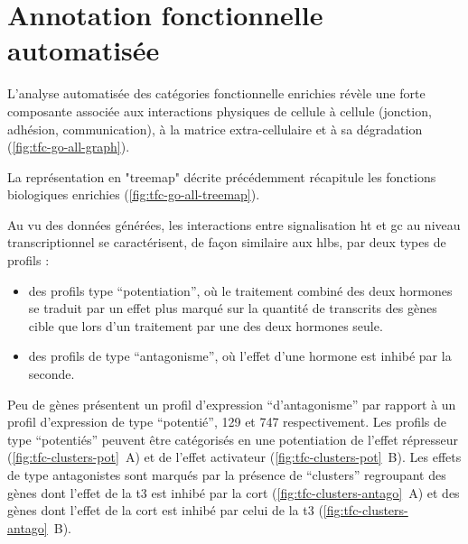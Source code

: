 \documentclass[../main.tex]{subfiles}
\begin{document}


\section{Annotation fonctionnelle automatisée}

L'analyse automatisée des catégories fonctionnelle enrichies révèle une forte composante associée aux interactions physiques de cellule à cellule (jonction, adhésion, communication), à la matrice extra-cellulaire et à sa dégradation (\autoref{fig:tfc-go-all-graph}).



La représentation en "treemap" décrite précédemment récapitule les fonctions biologiques enrichies (\autoref{fig:tfc-go-all-treemap}).



Au vu des données générées, les interactions entre signalisation \gls{ht} et \gls{gc} au niveau transcriptionnel se caractérisent, de façon similaire aux \glspl{hlb}, par deux types de profils :
\begin{itemize}
\item des profils type ``potentiation'', où le traitement combiné des deux hormones se traduit par un effet plus marqué sur la quantité de transcrits des gènes cible que lors d'un traitement par une des deux hormones seule.
\item des profils de type ``antagonisme'', où l'effet d'une hormone est inhibé par la seconde.
\end{itemize}
\par
Peu de gènes présentent un profil d'expression ``d'antagonisme'' par rapport à un profil d'expression de type ``potentié'', 129 et 747 respectivement.
Les profils de type ``potentiés'' peuvent être catégorisés en une potentiation de l'effet répresseur (\autoref{fig:tfc-clusters-pot}~A) et de l'effet activateur (\autoref{fig:tfc-clusters-pot}~B).
Les effets de type antagonistes sont marqués par la présence de ``clusters'' regroupant des gènes dont l'effet de la \gls{t3} est inhibé par la \gls{cort} (\autoref{fig:tfc-clusters-antago}~A) et des gènes dont l'effet de la \gls{cort} est inhibé par celui de la \gls{t3} (\autoref{fig:tfc-clusters-antago}~B).


\end{document}

